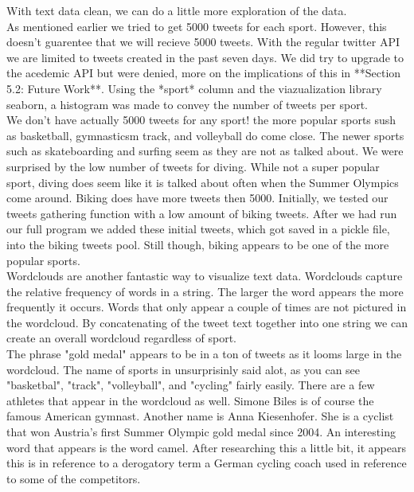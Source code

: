 \documentclass[12pt]{article}
\begin{document}
            With text data clean, we can do a little more exploration of the data. \\

            As mentioned earlier we tried to get 5000 tweets for each sport. However, this doesn't guarentee that we will recieve 5000 tweets. With the regular
            twitter API we are limited to tweets created in the past seven days. We did try to upgrade to the acedemic API but were denied, more on the implications 
            of this in **Section 5.2: Future Work**. Using the *sport* column and the viazualization library seaborn, a histogram was made to convey the number of 
            tweets per sport. \\

            We don't have actually 5000 tweets for any sport! the more popular sports sush as basketball, gymnasticsm track, and volleyball do come close. The newer
            sports such as skateboarding and surfing seem as they are not as talked about. We were surprised by the low number of tweets for diving. While not a 
            super popular sport, diving does seem like it is talked about often when the Summer Olympics come around. Biking does have more tweets then 5000. 
            Initially, we tested our tweets gathering function with a low amount of biking tweets. After we had run our full program we added these initial tweets, 
            which got saved in a pickle file, into the biking tweets pool. Still though, biking appears to be one of the more popular sports. \\

            Wordclouds are another fantastic way to visualize text data. Wordclouds capture the relative frequency of words in a string. The larger the word appears 
            the more frequently it occurs. Words that only appear a couple of times are not pictured in the wordcloud. By concatenating of the tweet text together 
            into one string we can create an overall wordcloud regardless of sport.\\ 

            The phrase "gold medal" appears to be in a ton of tweets as it looms large in the wordcloud. The name of sports in unsurprisinly said alot, as you can 
            see "basketbal", "track", "volleyball",  and "cycling" fairly easily. There are a few athletes that appear in the wordcloud as well. Simone Biles is of 
            course the famous American gymnast. Another name is Anna Kiesenhofer. She is a cyclist that won Austria's first Summer Olympic gold medal since 2004. An 
            interesting word that appears is the word camel. After researching this a little bit, it appears this is in reference to a derogatory term a German 
            cycling coach used in reference to some of the competitors. \\
\end{document}
